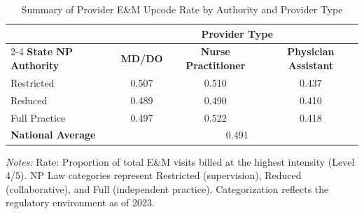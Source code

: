 \begin{table}[htbp]
    \centering
    \caption{Summary of Provider E\&M Upcode Rate by Authority and Provider Type}
    \label{tab:partb_em_upcode_rate_provtype}
    \vspace{0.2cm}
    \begin{tabular}{lccc}
        \toprule
        & \multicolumn{3}{c}{\textbf{Provider Type}} \\
        \cmidrule(lr){2-4}
        \textbf{State NP Authority} & \textbf{MD/DO} & \textbf{Nurse Practitioner} & \textbf{Physician Assistant} \\
        \midrule
        Restricted & 0.507 & 0.510 & 0.437 \\
        Reduced & 0.489 & 0.490 & 0.410 \\
        Full Practice & 0.497 & 0.522 & 0.418 \\
        \midrule
        \textbf{National Average} & \multicolumn{3}{c}{0.491} \\
        \bottomrule
    \end{tabular}
    \vspace{0.1cm}
    \begin{minipage}{0.85\textwidth}
        \footnotesize \textit{Notes:} Rate: Proportion of total E\&M visits billed at the highest intensity (Level 4/5). NP Law categories represent Restricted (supervision), Reduced (collaborative), and Full (independent practice). Categorization reflects the regulatory environment as of 2023.
    \end{minipage}
\end{table}